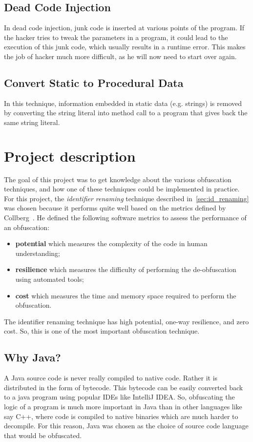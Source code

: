 \documentclass{article}
\begin{document}
\subsection{Dead Code Injection}
In dead code injection, junk code is inserted at various points of the program. If the hacker
tries to tweak the parameters in a program, it could lead to the execution of this junk
code, which usually results in a runtime error. This makes the job of hacker much more
difficult, as he will now need to start over again.


\subsection{Convert Static to Procedural Data}
In this technique, information embedded in static data (e.g. strings) is removed by converting the string literal 
into method call to a program that gives back the same string literal.


\section{Project description}
The goal of this project was to get knowledge about the various obfuscation techniques, and how one of these techniques could be 
implemented in practice. For this project, the \textit{identifier renaming} technique described in~\ref{sec:id_renaming} was chosen because it performs 
quite well based on the metrics defined by Collberg~\cite{collberg}. He defined the following software metrics to assess the performance of an obfuscation:
\begin{itemize}
\item \textbf{potential} which measures the complexity of the code in human understanding;
\item \textbf{resilience} which measures the difficulty of performing the de-obfuscation using
automated tools;
\item \textbf{cost} which measures the time and memory space required to perform the
obfuscation.
\end{itemize}
The identifier renaming technique has high potential, one-way resilience, and zero cost. So, this is one of the most important obfuscation technique.

\subsection{Why Java?}
A Java source code is never really compiled to native code. Rather it is distributed in
the form of bytecode. This bytecode can be easily converted back to a java program using popular IDEs like IntelliJ IDEA. 
So, obfuscating the logic of a program is much more important in Java than in other languages like say C++, where code is compiled
to native binaries which are much harder to decompile. For this reason, Java was chosen as the choice of source code language that would be obfuscated.
\end{document}
